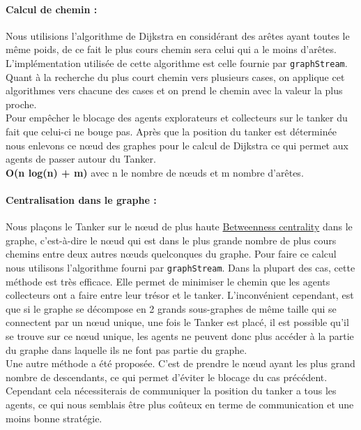 \documentclass[10pt]{article}
\newcommand\tab[1][0.65cm]{\hspace*{#1}}
\begin{document}
\paragraph{Calcul de chemin :} Nous utilisions l'algorithme de Dijkstra en considérant des arêtes ayant toutes le même poids, de ce fait le plus cours chemin sera celui qui a le moins d'arêtes. L'implémentation utilisée de cette algorithme est celle fournie par \texttt{graphStream}. Quant à la recherche du plus court chemin vers plusieurs cases, on applique cet algorithmes vers chacune des cases et on prend le chemin avec la valeur la plus proche.\\
\tab Pour empêcher le blocage des agents explorateurs et collecteurs sur le tanker du fait que celui-ci ne bouge pas. Après que la position du tanker est déterminée nous enlevons ce n\oe{}ud des graphes pour le calcul de Dijkstra ce qui permet aux agents de passer autour du Tanker.\\
\tab \textbf{O(n log(n) + m)} avec n le nombre de n\oe{}uds et m nombre d'arêtes.

\paragraph{Centralisation dans le graphe :} Nous plaçons le Tanker sur le n\oe{}ud de plus haute \href{https://en.wikipedia.org/wiki/Betweenness_centrality}{Betweenness centrality} dans le graphe, c'est-à-dire le n\oe{}ud  qui est dans le plus grande nombre de plus cours chemins entre deux autres n\oe{}uds quelconques du graphe. Pour faire ce calcul nous utilisons l'algorithme fourni par \texttt{graphStream}. Dans la plupart des cas, cette méthode est très efficace. Elle permet de minimiser le chemin que les agents collecteurs ont a faire entre leur trésor et le tanker. L'inconvénient cependant, est que si le graphe se décompose en 2 grands sous-graphes de même taille qui se connectent par un n\oe{}ud unique, une fois le Tanker est placé, il est possible qu'il se trouve sur ce n\oe{}ud unique, les agents ne peuvent donc plus accéder à la partie du graphe dans laquelle ils ne font pas partie du graphe.\\
\tab Une autre méthode a été proposée. C'est de prendre le n\oe{}ud ayant les plus grand nombre de descendants, ce qui permet d'éviter le blocage du cas précédent. Cependant cela nécessiterais de communiquer la position du tanker a tous les agents, ce qui nous semblais être plus coûteux en terme de communication et une moins bonne stratégie.
\end{document}
